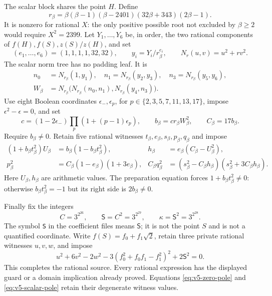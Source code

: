 The scalar block shares the point $H$. Define
\[
 r_\beta=\beta(\beta-1)(\beta-2401)(32\beta+343)(2\beta-1).
\]
It is nonzero for rational $X$: the only positive possible root not
excluded by $\beta\ge2$ would require $X^2=2399$.
Let $Y_1,\ldots,Y_6$ be, in order, the two rational components of
$f(H),f(S),z(S)/z(H)$, and set
\[
 (e_1,\ldots,e_6)=(1,1,1,1,32,32),\qquad
 y_i=Y_i/r_\beta^{e_i},\qquad N_r(u,v)=u^2+rv^2.
\]
The scalar norm tree has no padding leaf. It is
\begin{equation}\label{eq:v5-scalar-tree}
 \begin{aligned}
 n_0&=N_{r_\beta}(1,y_1),\quad n_1=N_{r_\beta}(y_2,y_3),\quad
 n_3=N_{r_\beta}(y_5,y_6),\\
 W_\beta&=N_{r_\beta}\bigl(N_{r_\beta}(n_0,n_1),
                          N_{r_\beta}(y_4,n_3)\bigr).
 \end{aligned}
\end{equation}
Use eight Boolean coordinates $\epsilon_-,\epsilon_p$, for
$p\in\{2,3,5,7,11,13,17\}$, impose $\epsilon^2-\epsilon=0$, and set
\[
 c=(1-2\epsilon_-)\prod_p(1+(p-1)\epsilon_p),\qquad
 b_\beta=c r_\beta W_\beta^2,\qquad C_\beta=17b_\beta.
\]
Require $b_\beta\ne0$. Retain five rational witnesses
$t_\beta,e_\beta,s_\beta,p_\beta,q_\beta$ and impose
\begin{align}
 (1+b_\beta t_\beta^2)U_\beta
    &=b_\beta(1-b_\beta t_\beta^2),
 &h_\beta&=e_\beta(C_\beta-U_\beta^2),\label{eq:v5-scalar-preparation}\\
 p_\beta^2&=C_\beta(1-e_\beta)(1+3e_\beta),
 &C_\beta q_\beta^2&=(s_\beta^2-C_\beta h_\beta)
                     (s_\beta^2+3C_\beta h_\beta).
 \label{eq:v5-scalar-pole}
\end{align}
Here $U_\beta,h_\beta$ are arithmetic values. The preparation equation
forces $1+b_\beta t_\beta^2\ne0$: otherwise $b_\beta t_\beta^2=-1$
but its right side is $2b_\beta\ne0$.

Finally fix the integers
\begin{equation}\label{eq:v5-fixed-constant}
 C=3^{2^{26}},\qquad \mathsf S=C^2=3^{2^{27}},\qquad
 \kappa=\mathsf S^2=3^{2^{28}}.
\end{equation}
The symbol \texttt{S} in the coefficient files means $\mathsf S$;
it is not the point $S$ and is not a quantified coordinate.
Write $f(S)=f_0+f_1\sqrt2$, retain three private rational witnesses
$u,v,w$, and impose
\begin{equation}\label{eq:v5-physical-anchor}
 u^2+6v^2-2w^2-3(f_0^2+f_0f_1-f_1^2)^2+2\mathsf S^2=0.
\end{equation}
This completes the rational source. Every rational expression has the
displayed guard or a domain implication already proved. Equations
\eqref{eq:v5-zero-pole} and \eqref{eq:v5-scalar-pole} retain their
degenerate witness values.


